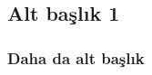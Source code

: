 \lipsum[9-10]

\subsection{Alt başlık 1}


\lipsum[11-12]

\subsubsection{Daha da alt başlık }


\lipsum[13-14]